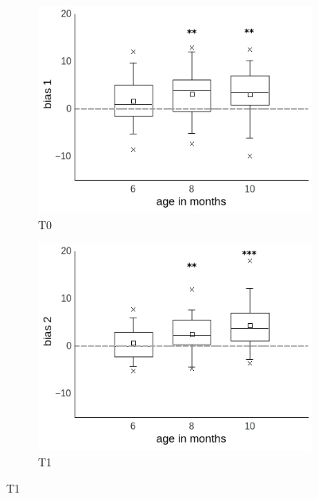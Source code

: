 \documentclass[a4paper]{scrreprt}
\begin{document}
\begin{figure}
\centering
    \begin{subfigure}[b]{0.49\textwidth}
        \includegraphics[width=\textwidth]{figs/sec3/age/age_diff1_mod2.jpeg}
        \caption{T0}
    \end{subfigure}
\begin{subfigure}[b]{0.49\textwidth}
        \includegraphics[width=\textwidth]{figs/sec3/age/age_diff2_mod2.jpeg}
        \caption{T1}
    \end{subfigure}
    

\end{figure}
\end{document}
